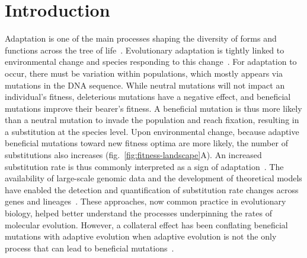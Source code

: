 \documentclass[12pt]{article}
\begin{document}
\section*{Introduction}
Adaptation is one of the main processes shaping the diversity of forms and functions across the tree of life~\cite{darwin_origin_1859}.
Evolutionary adaptation is tightly linked to environmental change and species responding to this change~\cite{merrell_adaptive_1994, gavrilets_adaptive_2009}.
For adaptation to occur, there must be variation within populations, which mostly appears via mutations in the DNA sequence.
While neutral mutations will not impact an individual's fitness, deleterious mutations have a negative effect, and beneficial mutations improve their bearer's fitness.
A beneficial mutation is thus more likely than a neutral mutation to invade the population and reach fixation, resulting in a substitution at the species level.
Upon environmental change, because adaptive beneficial mutations toward new fitness optima are more likely, the number of substitutions also increases (fig.~\ref{fig:fitness-landscape}A).
An increased substitution rate is thus commonly interpreted as a sign of adaptation~\cite{mcdonald_adaptative_1991, smith_adaptive_2002, welch_estimating_2006}.
The availability of large-scale genomic data and the development of theoretical models have enabled the detection and quantification of substitution rate changes across genes and lineages~\cite{yang_statistical_2000, eyre-walker_genomic_2006, moutinho_variation_2019}.
These approaches, now common practice in evolutionary biology, helped better understand the processes underpinning the rates of molecular evolution.
However, a collateral effect has been conflating beneficial mutations with adaptive evolution when adaptive evolution is not the only process that can lead to beneficial mutations~\cite{charlesworth_other_2007, mustonen_fitness_2009}.
\end{document}
